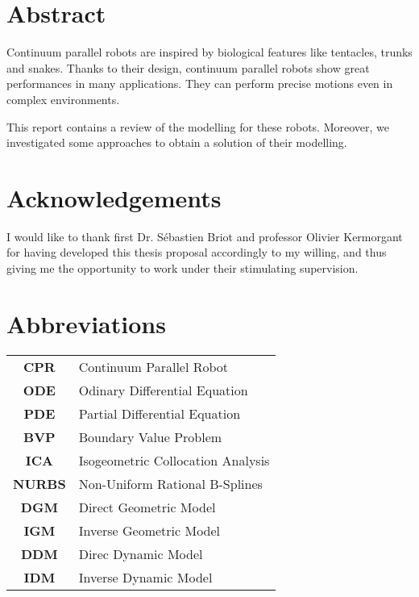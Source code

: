 \documentclass{thesisreport}
\begin{document}
   
 
  \section*{Abstract}
 Continuum parallel robots are inspired by biological features like tentacles, trunks and snakes. Thanks to their design, continuum parallel robots show great performances in many applications. They can perform precise motions even in complex environments. 
 
 This report contains a review of the modelling for these robots. Moreover, we investigated some approaches to obtain a solution of their modelling. 
 
 
 
 
 
 \newpage
 
 \section*{Acknowledgements}
 I would like to thank first Dr. Sébastien Briot and professor Olivier Kermorgant for having developed this thesis proposal accordingly to my willing, and thus giving me the opportunity to work under their stimulating supervision. 
 
  \section*{Abbreviations}
 \begin{tabular}{cp{}}
 	\textbf{CPR}	&	Continuum Parallel Robot			\\
 	\textbf{ODE}	&	Odinary Differential Equation		\\
 	\textbf{PDE}	&	Partial Differential Equation		\\
 	\textbf{BVP}	&	Boundary Value Problem				\\
 	\textbf{ICA}	&	Isogeometric Collocation Analysis	\\
 	\textbf{NURBS}	&	Non-Uniform Rational B-Splines		\\
 	\textbf{DGM}	&	Direct Geometric Model				\\
 	\textbf{IGM}	&	Inverse Geometric Model				\\
 	\textbf{DDM}	&	Direc Dynamic Model					\\
 	\textbf{IDM}	&	Inverse Dynamic Model				\\
 \end{tabular}

 \tableofcontents
 
\end{document}
